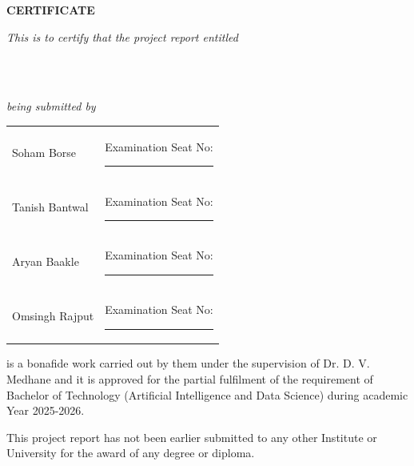 
\begin{center}

\vspace*{3\baselineskip}
{\Large \bf{CERTIFICATE}} \\

\end{center}

\vspace{0.4cm}
\centerline{\textit{This is to certify that the project report entitled}}
\vspace*{0.6\baselineskip}
{\bfseries \fontsize{16}{12} \centering\selectfont{BrandShield AI}  \\}
\vspace*{0.3\baselineskip}
{\bfseries \fontsize{14}{12} \centering\selectfont{Real-Time Brand Risk and Sentiment Intelligence System}  \\}
\vspace*{0.6\baselineskip}

\centerline{\textit{being submitted by}}
\vspace*{0.5\baselineskip}

{\large \begin{center}
\begin{tabular}{l l}
Soham Borse        & Examination Seat No: \rule{3cm}{0.4pt} \\
Tanish Bantwal     & Examination Seat No: \rule{3cm}{0.4pt} \\
Aryan Baakle       & Examination Seat No: \rule{3cm}{0.4pt} \\
Omsingh Rajput     & Examination Seat No: \rule{3cm}{0.4pt} \\
\end{tabular}
\end{center}}

\vspace*{1.5\baselineskip}
\noindent is a bonafide work carried out by them under the supervision of Dr. D. V. Medhane and it is approved for the partial fulfilment of the requirement of Bachelor of Technology (Artificial Intelligence and Data Science) during academic Year 2025-2026.

\vspace*{0.8\baselineskip}
\noindent This project report has not been earlier submitted to any other Institute or University for the award of any degree or diploma.

\vspace*{3.5\baselineskip}

